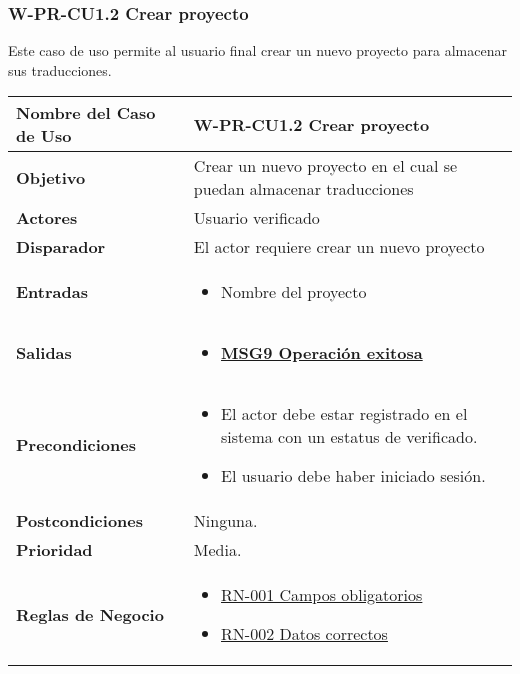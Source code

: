 \subsubsection{W-PR-CU1.2 Crear proyecto}
Este caso de uso permite al usuario final crear un nuevo proyecto para almacenar sus traducciones.

\begin{longtable}{|J{5cm}|J{10.3cm}|}
	\hline
	\textbf{Nombre del Caso de Uso} &
		W-PR-CU1.2 Crear proyecto \\ \hline
	\textbf{Objetivo} &
		Crear un nuevo proyecto en el cual se puedan almacenar traducciones \\ \hline
	\textbf{Actores} &
		Usuario verificado \\ \hline 
	\textbf{Disparador} & 
		El actor requiere crear un nuevo proyecto \\ \hline 
	\textbf{Entradas} & 
		\begin{itemize}
				\item Nombre del proyecto
		\end{itemize}\\ \hline 
	\textbf{Salidas} & 
		\begin{itemize}
			\item \hyperref[MSG9]{\bf MSG9 Operación exitosa}
		\end{itemize} \\ \hline
	\textbf{Precondiciones} &
		\begin{itemize}
		    \item El actor debe estar registrado en el sistema con un estatus de verificado.
		    \item El usuario debe haber iniciado sesión.
		\end{itemize} \\ \hline
	\textbf{Postcondiciones} &
		Ninguna. \\ \hline
	\textbf{Prioridad} & 
		Media. \\ \hline
	\textbf{Reglas de Negocio} & 
		\begin{itemize}
			\item \hyperref[RN001]{RN-001 Campos obligatorios}
			\item \hyperref[RN002]{RN-002 Datos correctos}
		\end{itemize} \\ \hline

\end{longtable}

